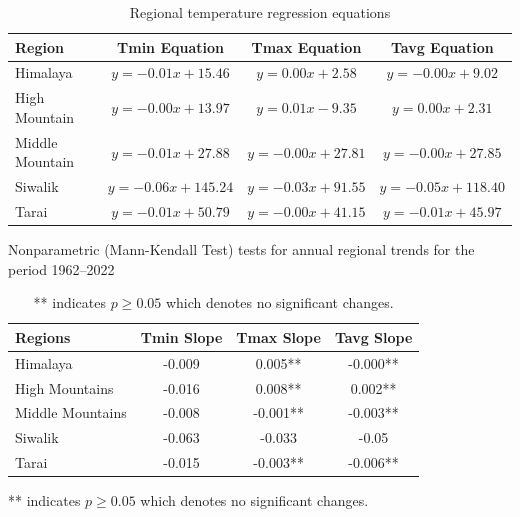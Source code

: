 \begin{table}[htbp]
  \centering
  \caption{Regional temperature regression equations}
  \begin{tabular}{@{}lccc@{}}
      \toprule
      \textbf{Region} & \textbf{Tmin Equation} & \textbf{Tmax Equation} & \textbf{Tavg Equation} \\ 
      \midrule
      Himalaya & \( y = -0.01x + 15.46 \) & \( y = 0.00x + 2.58 \) & \( y = -0.00x + 9.02 \) \\ 
      High Mountain & \( y = -0.00x + 13.97 \) & \( y = 0.01x - 9.35 \) & \( y = 0.00x + 2.31 \) \\ 
      Middle Mountain & \( y = -0.01x + 27.88 \) & \( y = -0.00x + 27.81 \) & \( y = -0.00x + 27.85 \) \\ 
      Siwalik & \( y = -0.06x + 145.24 \) & \( y = -0.03x + 91.55 \) & \( y = -0.05x + 118.40 \) \\ 
      Tarai & \( y = -0.01x + 50.79 \) & \( y = -0.00x + 41.15 \) & \( y = -0.01x + 45.97 \) \\ 
      \bottomrule
  \end{tabular}
  \label{tab:regression_equations}
\end{table}




\begin{table}[H]
  \centering
  \caption{Nonparametric (Mann-Kendall Test) tests for annual regional trends for the period 1962–2022}
  \begin{tabular}{@{}lccc@{}}
      \toprule
      \textbf{Regions} & \textbf{Tmin Slope} & \textbf{Tmax Slope} & \textbf{Tavg Slope} \\ 
      \midrule
      Himalaya        & -0.009       & 0.005**      & -0.000** \\ 
      High Mountains  & -0.016       & 0.008**      & 0.002**  \\ 
      Middle Mountains & -0.008      & -0.001**     & -0.003** \\ 
      Siwalik         & -0.063       & -0.033       & -0.05    \\ 
      Tarai           & -0.015       & -0.003**     & -0.006** \\ 
      \bottomrule
  \end{tabular}
  \label{tab:mann_kendall}
  \begin{flushleft}
    \footnotesize{** indicates $p \geq 0.05$ which denotes no significant changes.}
\end{flushleft}
  \caption*{** indicates $p \geq 0.05$ which denotes no significant changes.}
\end{table}



